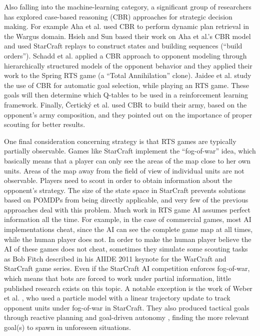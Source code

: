 \documentclass[journal]{IEEEtran}
\begin{document}
Also falling into the machine-learning category, a significant group of researchers has explored case-based reasoning (CBR) \cite{Aamodt94CBR} approaches for strategic decision making. For example Aha et al. \cite{LTW} used CBR to perform dynamic plan retrieval in the Wargus domain. Hsieh and Sun \cite{HsiehS08} based their work on Aha et al.'s CBR model \cite{LTW} and used StarCraft replays to construct states and building sequences (``build orders''). Schadd et al. \cite{SchaddBS07} applied a CBR approach to opponent modeling through hierarchically structured models of the opponent behavior and they applied their work to the Spring RTS game (a ``Total Annihilation'' clone). Jaidee et al. \cite{jaidee2011case} study the use of CBR for automatic goal selection, while playing an RTS game. These goals will then determine which Q-tables to be used in a reinforcement learning framework. Finally, \v{C}ertick\'{y} et al. \cite{certicky2013cbr} used CBR to build their army, based on the opponent's army composition, and they pointed out on the importance of proper scouting for better results.

One final consideration concerning strategy is that RTS games are typically partially observable. Games like StarCraft implement the ``fog-of-war'' idea, which basically means that a player can only see the areas of the map close to her own units. Areas of the map away from the field of view of individual units are not observable. Players need to scout in order to obtain information about the opponent's strategy. The size of the state space in StarCraft prevents solutions based on POMDPs from being directly applicable, and very few of the previous approaches deal with this problem. Much work in RTS game AI assumes perfect information all the time. For example, in the case of commercial games, most AI implementations cheat, since the AI can see the complete game map at all times, while the human player does not. In order to make the human player believe the AI of these games does not cheat, sometimes they simulate some scouting tasks as Bob Fitch described in his AIIDE 2011 keynote for the WarCraft and StarCraft game series. Even if the StarCraft AI competition enforces fog-of-war, which means that bots are forced to work under partial information, little published research exists on this topic. A notable exception is the work of Weber et al. \cite{WeberAIIDE11}, who used a particle model with a linear trajectory update to track opponent units under fog-of-war in StarCraft. They also produced tactical goals through reactive planning and goal-driven autonomy \cite{WeberCig10,Weber10}, finding the more relevant goal(s) to spawn in unforeseen situations. 
\end{document}
